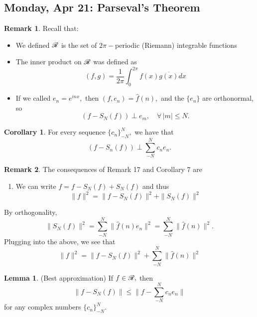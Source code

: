 \documentclass[10pt, oneside]{article}
\theoremstyle{definition}
\newtheorem{rem}{Remark}
\newtheorem{lem}{Lemma}
\newtheorem{cor}{Corollary}
\begin{document}
\newpage
\subsection{Monday, Apr 21: Parseval's Theorem}
\begin{rem}
    Recall that:
\begin{itemize}
    \item We defined $\cal R$ is the set of $2\pi-$periodic (Riemann) integrable functions
    \item The inner product on $\cal R$ was defined as 
    \[(f,g)= \frac{1}{2\pi}\int_0^{2\pi} f(x)\overline{g(x)}dx\]
    \item If we called $e_n = e^{inx},$ then $(f,e_n) = \hat{f}(n),$ and the $\{e_n\}$ are orthonormal, so 
    \[(f - S_N(f)) \perp e_m, \quad \forall\, |m| \leq N.\]
\end{itemize}
\end{rem}

\begin{cor}
    For every sequence $\{c_n\}_{-N}^N,$ we have that 
    \[( f- S_n(f))\perp \sum_{-N}^N c_n e_n.\]
\end{cor}
\begin{rem}
The consequences of Remark 17 and Corollary 7 are 
    \begin{enumerate}
        \item We can write $f = f - S_N(f) + S_N(f)$ and thus
        \[\|f\|^2 = \|f - S_N(f)\|^2 + \|S_N(f)\|^2\]
    \end{enumerate}
    By orthogonality, 
    \[\|S_N(f)\|^2 = \sum_{-N}^N \|\hat{f}(n)e_n\|^2 = \sum_{-N}^N \|\hat{f}(n)\|^2.\] Plugging into the above, we see that
    \[\|f\|^2 = \|f - S_N(f)\|^2 + \sum_{-N}^N \|\hat{f}(n)\|^2\]
\end{rem}
\begin{lem}
    (Best approximation) If $f\in \cal R,$ then 
    \[\|f - S_N(f)\| \leq \|f - \sum_{-N}^N c_n e_n\|\] for any complex numbers $\{c_n\}_{-N}^N.$
\end{lem}
\end{document}
